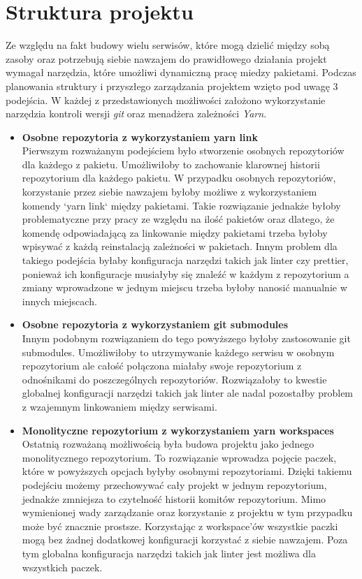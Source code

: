 \section{Struktura projektu}
Ze względu na fakt budowy wielu serwisów, które mogą dzielić między sobą zasoby oraz potrzebują siebie nawzajem do prawidłowego działania projekt wymagał narzędzia, które umożliwi dynamiczną pracę miedzy pakietami. Podczas planowania struktury i przyszłego zarządzania projektem wzięto pod uwagę 3 podejścia. W każdej z przedstawionych możliwości założono wykorzystanie narzędzia kontroli wersji \textit{git} oraz menadżera zależności \textit{Yarn}.

\begin{itemize}
    \item \textbf {Osobne repozytoria z wykorzystaniem yarn link} \\
        Pierwszym rozważanym podejściem było stworzenie osobnych repozytoriów dla każdego z pakietu.
        Umożliwiłoby to zachowanie klarownej historii repozytorium dla każdego pakietu. W przypadku osobnych repozytoriów, korzystanie przez siebie nawzajem byłoby możliwe z wykorzystaniem komendy `yarn link` między pakietami. Takie rozwiązanie jednakże byłoby problematyczne przy pracy ze względu na ilość pakietów oraz dlatego, że komendę odpowiadającą za linkowanie między pakietami trzeba byłoby wpisywać z każdą reinstalacją zależności w pakietach. Innym problem dla takiego podejścia byłaby konfiguracja narzędzi takich jak linter czy prettier, ponieważ ich konfiguracje musiałyby się znaleźć w każdym z repozytorium a zmiany wprowadzone w jednym miejscu trzeba byłoby nanosić manualnie w innych miejscach. \cite{YarnLinkDocs}

    \item \textbf {Osobne repozytoria z wykorzystaniem git submodules} \\
        Innym podobnym rozwiązaniem do tego powyższego byłoby zastosowanie git submodules. Umożliwiłoby to utrzymywanie każdego serwisu w osobnym repozytorium ale całość połączona miałaby swoje repozytorium z odnośnikami do poszczególnych repozytoriów. Rozwiązałoby to kwestie globalnej konfiguracji narzędzi takich jak linter ale nadal pozostałby problem z wzajemnym linkowaniem między serwisami. \cite{GitSubmodulesDocs}

    \item \textbf {Monolityczne repozytorium z wykorzystaniem yarn workspaces} \\
        Ostatnią rozważaną możliwością była budowa projektu jako jednego monolitycznego repozytorium. To rozwiązanie wprowadza pojęcie paczek, które w powyższych opcjach byłyby osobnymi repozytoriami. Dzięki takiemu podejściu możemy przechowywać cały projekt w jednym repozytorium, jednakże zmniejsza to czytelność historii komitów repozytorium. Mimo wymienionej wady zarządzanie oraz korzystanie z projektu w tym przypadku może być znacznie prostsze. Korzystając z workspace'ów wszystkie paczki mogą bez żadnej dodatkowej konfiguracji korzystać z siebie nawzajem. Poza tym globalna konfiguracja narzędzi takich jak linter jest możliwa dla wszystkich paczek. \cite{YarnWorkspacesDocs}

\end{itemize}

